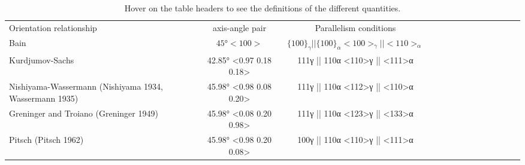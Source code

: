 
\begin{table*}
\caption{Hover on the table headers to see the definitions of the  different quantities.}
\label{table}
\begin{tabular}{l c | c c c c c c  c c c c c c}
\hline\hline
    Orientation relationship & axis-angle pair & Parallelism conditions \\
    Bain \cite{bain1924nature} & \(45°<100>\) & $\{100\}_{\gamma} || \{100\}_{\alpha} <100>_{\gamma } || <110>_{\alpha}$ \\
    Kurdjumov-Sachs \cite{kurdjumow1930mechanismus} & 42.85° <0.97 0.18 0.18> & {111}γ || {110}α <110>γ || <111>α \\
    Nishiyama-Wassermann (Nishiyama 1934, Wassermann 1935) & 45.98° <0.98 0.08 0.20> & {111}γ || {110}α <112>γ || <110>α \\
    Greninger and Troiano (Greninger 1949) & 45.98° <0.08 0.20 0.98> & {111}γ || {110}α <123>γ || <133>α \\
    Pitsch (Pitsch 1962) & 45.98° <0.98 0.20 0.08> & {100}γ || {110}α <110>γ || <111>α \\
\hline
\end{tabular}
\end{table*}
